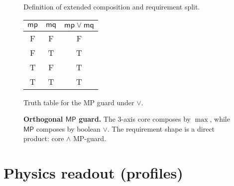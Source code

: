 \documentclass[11pt]{article}
\newcommand{\MP}{\mathsf{MP}}
\theoremstyle{plain}
\theoremstyle{definition}
\theoremstyle{remark}
\begin{document}
\begin{figure}[t]
  \centering
  \begin{minipage}[t]{0.47\linewidth}
    \centering
    \vspace{0.6em}

    \small Definition of extended composition and requirement split.
  \end{minipage}\hfill
  \begin{minipage}[t]{0.47\linewidth}
    \centering
    \setlength{\tabcolsep}{10pt}
    \renewcommand{\arraystretch}{1.2}
    \begin{tabular}{cc|c}
      $\mathsf{mp}$ & $\mathsf{mq}$ & $\mathsf{mp}\lor\mathsf{mq}$ \\\hline
      F & F & F \\
      F & T & T \\
      T & F & T \\
      T & T & T \\
    \end{tabular}

    \vspace{0.6em}
    \small Truth table for the MP guard under $\lor$.
  \end{minipage}

  \caption{\textbf{Orthogonal $\MP$ guard.}
  The 3-axis core composes by $\max$, while $\MP$ composes by boolean $\lor$.
  The requirement shape is a direct product: core $\wedge$ MP-guard.}
  \label{fig:mp-orthogonal}
\end{figure}

\section{Physics readout (profiles)}
\end{document}
